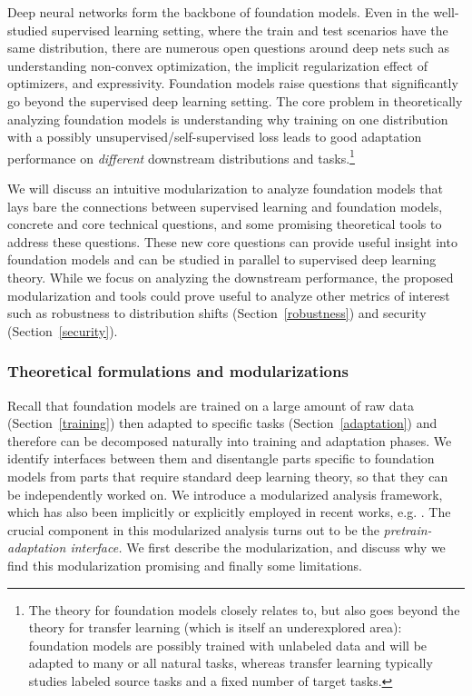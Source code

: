 Deep neural networks form the backbone of foundation models. Even in the well-studied supervised learning setting, where the train and test scenarios have the same distribution, there are numerous open questions around deep nets such as understanding non-convex optimization, the implicit regularization effect of optimizers, and expressivity. Foundation models raise questions that significantly go beyond the supervised deep learning setting. The core problem in theoretically analyzing foundation models is understanding why training on one distribution with a possibly unsupervised/self-supervised loss leads to good adaptation performance on \emph{different} downstream distributions and tasks.\footnote{The theory for foundation models closely relates to, but also goes beyond the theory for transfer learning (which is itself an underexplored area): foundation models are possibly trained with unlabeled data and will be adapted to many or all natural tasks, whereas transfer learning typically studies labeled source tasks and a fixed number of target tasks.}

We will discuss an intuitive modularization to analyze foundation models that lays bare the connections between supervised learning and foundation models, concrete and core technical questions, and some promising theoretical tools to address these questions. These new core questions can provide useful insight into foundation models and can be studied in parallel to supervised deep learning theory. While we focus on analyzing the downstream performance, the proposed modularization and tools could prove useful to analyze other metrics of interest such as robustness to distribution shifts (Section~\ref{robustness}) and security (Section~\ref{security}).

\subsubsection{Theoretical formulations and modularizations}
\label{sec:theory-modularizations}
Recall that foundation models are trained on a large amount of raw data (Section~\ref{training})  then adapted to specific tasks (Section~\ref{adaptation}) and therefore can be decomposed naturally into training and adaptation phases. We identify interfaces between them and disentangle parts specific to foundation models from parts that require standard deep learning theory, so that they can be independently worked on. We introduce a modularized analysis framework, which has also been implicitly or explicitly employed in recent works, e.g. \citet{arora2019theoretical,haochen2021spectral,wei2020theoretical,tripuraneni2020theory}. The crucial component in this modularized analysis turns out to be the \emph{pretrain-adaptation interface.} We first describe the modularization, and discuss why we find this modularization promising and finally some limitations. 

